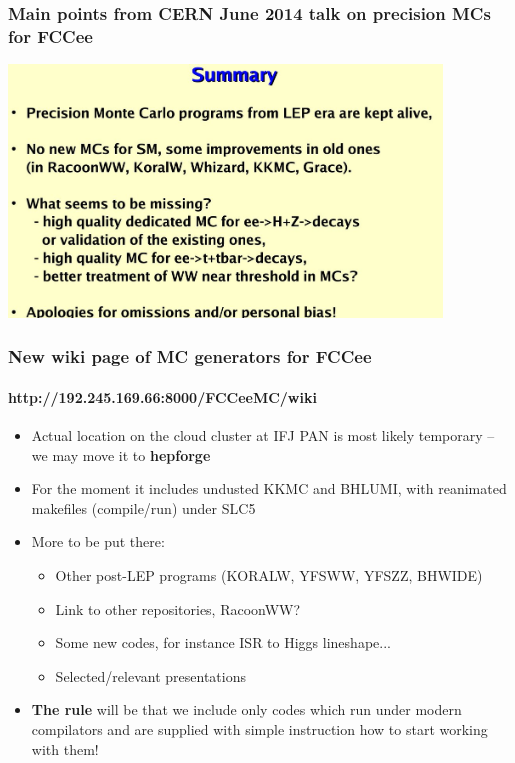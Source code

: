\documentclass{beamer}
\newcommand{\crd}{\color{red}}
\newcommand{\ns}{\normalsize}
\begin{document}
\begin{frame}[fragile]
\frametitle{\bf\ns 
 Main points from CERN June 2014 talk on precision MCs for FCCee}

\includegraphics[width=115mm]{./sli12.jpg}
\end{frame}



\begin{frame}[fragile]
\frametitle{\bf New wiki page of MC generators for FCCee}
\framesubtitle{\bf http://192.245.169.66:8000/FCCeeMC/wiki}

\begin{itemize}
\item
 Actual location on the cloud cluster at IFJ PAN is most likely
 temporary -- we may move it to {\bf hepforge}
\item
 For the moment it includes undusted KKMC and BHLUMI,
 with reanimated makefiles (compile/run) under SLC5
\item
 More to be put there:
\begin{itemize}
\item Other post-LEP programs (KORALW, YFSWW, YFSZZ, BHWIDE)
\item Link to other repositories, RacoonWW?
\item Some new codes, for instance ISR to Higgs lineshape...
\item Selected/relevant presentations
\end{itemize}
\item\crd
 {\bf The rule} will be that we include only codes which run
 under modern compilators 
 and are supplied with simple instruction 
 how to start working with them!
\end{itemize}
\end{frame}
\end{document}
